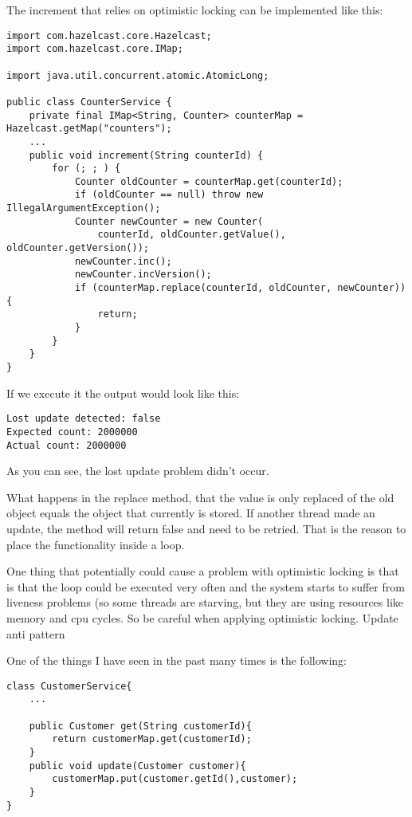 The increment that relies on optimistic locking can be implemented like this:

\begin{verbatim}
import com.hazelcast.core.Hazelcast;
import com.hazelcast.core.IMap;

import java.util.concurrent.atomic.AtomicLong;

public class CounterService {
    private final IMap<String, Counter> counterMap = Hazelcast.getMap("counters");
    ...
    public void increment(String counterId) {
        for (; ; ) {
            Counter oldCounter = counterMap.get(counterId);
            if (oldCounter == null) throw new IllegalArgumentException();
            Counter newCounter = new Counter(
                counterId, oldCounter.getValue(), oldCounter.getVersion());
            newCounter.inc();
            newCounter.incVersion();
            if (counterMap.replace(counterId, oldCounter, newCounter)) {
                return;
            } 
        }
    }
}
\end{verbatim}

If we execute it the output would look like this:

\begin{verbatim}
Lost update detected: false
Expected count: 2000000
Actual count: 2000000
\end{verbatim}

As you can see, the lost update problem didn't occur.

What happens in the replace method, that the value is only replaced of the old object equals the object that currently is stored. If another thread made an update, the method will return false and need to be retried. That is the reason to place the functionality inside a loop.

One thing that potentially could cause a problem with optimistic locking is that is that the loop could be executed very often and the system starts to suffer from liveness problems (so some threads are starving, but they are using resources like memory and cpu cycles. So be careful when applying optimistic locking.
Update anti pattern

One of the things I have seen in the past many times is the following:

\begin{verbatim}
class CustomerService{
    ...

    public Customer get(String customerId){
        return customerMap.get(customerId);
    }
    public void update(Customer customer){
        customerMap.put(customer.getId(),customer);
    }
}
\end{verbatim}

